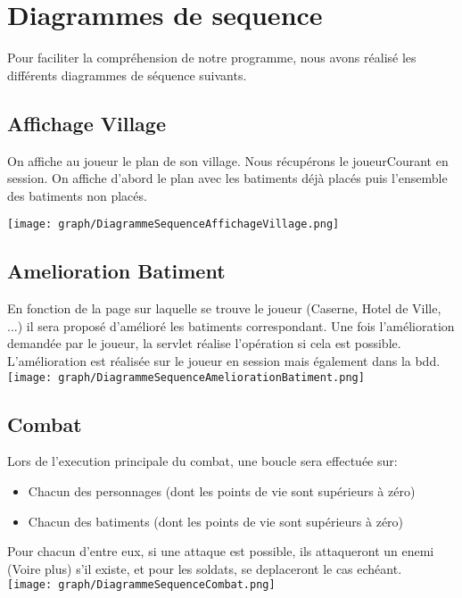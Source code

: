 \chapter{Diagrammes de sequence}
    Pour faciliter la compréhension de notre programme, nous avons réalisé les différents diagrammes de séquence suivants. 

    \section{Affichage Village}

    On affiche au joueur le plan de son village. Nous récupérons le joueurCourant en session. On affiche d'abord le plan avec les batiments déjà placés puis l'ensemble des batiments non placés. 
    
        \texttt{[image: graph/DiagrammeSequenceAffichageVillage.png]}
        
    
    \section{Amelioration Batiment}

    En fonction de la page sur laquelle se trouve le joueur (Caserne, Hotel de Ville, ...) il sera proposé d'amélioré les batiments correspondant. Une fois l'amélioration demandée par le joueur, la servlet réalise l'opération si cela est possible. L'amélioration est réalisée sur le joueur en session mais également dans la bdd.
        \texttt{[image: graph/DiagrammeSequenceAmeliorationBatiment.png]}
        
    
    \section{Combat}
        Lors de l'execution principale du combat, une boucle sera effectuée sur:
        \begin{itemize}
            \item Chacun des personnages (dont les points de vie sont supérieurs à zéro)
            \item Chacun des batiments (dont les points de vie sont supérieurs à zéro)
        \end{itemize}
        Pour chacun d'entre eux, si une attaque est possible, ils attaqueront un enemi (Voire plus) s'il existe, et pour les soldats, se deplaceront le cas echéant. \\
        \texttt{[image: graph/DiagrammeSequenceCombat.png]}    
    
